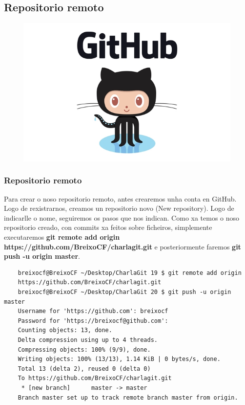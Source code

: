 \subsection{Repositorio remoto}
\begin{frame}
	\begin{figure}
	\centering
	\label{fig:github}
	\includegraphics[width=0.7\linewidth, height=0.7\textheight]{./img/github}
	\end{figure}
\end{frame}

\begin{frame}[fragile]
	\frametitle{Repositorio remoto}
	\scriptsize
	Para crear o noso repositorio remoto, antes crearemos unha conta en GitHub. Logo de rexistrarnos, creamos un repositorio novo (New repository). Logo de indicarlle o nome, seguiremos os pasos que nos indican. Como xa temos o noso repositorio creado, con commits xa feitos sobre ficheiros, simplemente executaremos \textbf{git remote add origin https://github.com/BreixoCF/charlagit.git} e posteriormente faremos \textbf{git push -u origin master}.
	\tiny
	\begin{verbatim}
	breixocf@BreixoCF ~/Desktop/CharlaGit 19 $ git remote add origin 
	https://github.com/BreixoCF/charlagit.git
	breixocf@BreixoCF ~/Desktop/CharlaGit 20 $ git push -u origin master 
	Username for 'https://github.com': breixocf
	Password for 'https://breixocf@github.com': 
	Counting objects: 13, done.
	Delta compression using up to 4 threads.
	Compressing objects: 100% (9/9), done.
	Writing objects: 100% (13/13), 1.14 KiB | 0 bytes/s, done.
	Total 13 (delta 2), reused 0 (delta 0)
	To https://github.com/BreixoCF/charlagit.git
	 * [new branch]      master -> master
	Branch master set up to track remote branch master from origin.
	\end{verbatim}	
\end{frame}

